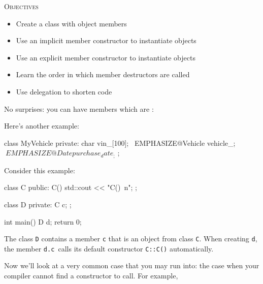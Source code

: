 \newpage{}

\textsc{Objectives}

\begin{itemize}
\item
  Create a class with object members
\item
  Use an implicit member constructor to instantiate objects
\item
  Use an explicit member constructor to instantiate objects
\item
  Learn the order in which member destructors are called
\item
  Use delegation to shorten code
\end{itemize}

\newpage{}

No surprises: you can have members which are :


Here's another example:

\begin{console}[commandchars=\~\@\$]
class MyVehicle
{     
private:
        char vin_[100];
        ~EMPHASIZE@Vehicle vehicle_;$
        ~EMPHASIZE@Date purchase_date_;$
};
\end{console}

\newpage{}

Consider this example:
\begin{console}
class C
{
public:
        C() { std::cout << "C()\ n"; }
};

class D
{
private:
        C c;
};

int main()
{   
    D d;
    return 0;
}
\end{console}

The class \texttt{D} contains a member \texttt{c} that is an object from
class \texttt{C}. When creating \texttt{d}, the member \texttt{d.c }calls its
default constructor \texttt{C::C()} automatically.

\newpage{}

Now we'll look at a very common case that you may run
into: the case when your compiler cannot find a constructor to call. For
example,

